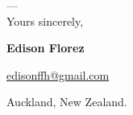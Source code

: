 \vfill
\begin{minipage}[c]{.75\textwidth}
    ---\\
    Yours sincerely,

    \vspace*{4mm}

    \textbf{Edison Florez}

    \href{mailto:edisonffh@gmail.com}{edisonffh@gmail.com}


    Auckland, New Zealand.
\end{minipage}
